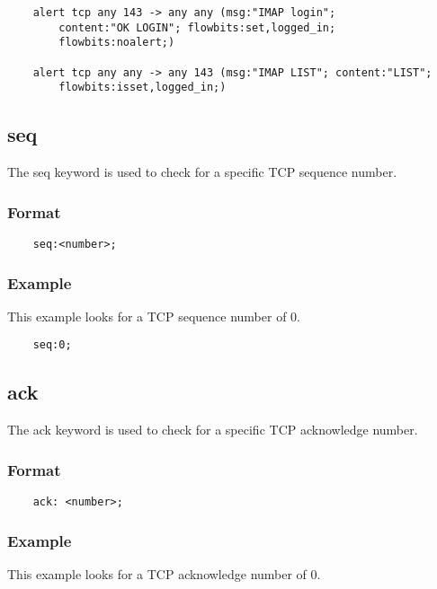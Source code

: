 \documentclass[english]{report}
\begin{document}
\begin{verbatim}
    alert tcp any 143 -> any any (msg:"IMAP login"; 
        content:"OK LOGIN"; flowbits:set,logged_in; 
        flowbits:noalert;)
      
    alert tcp any any -> any 143 (msg:"IMAP LIST"; content:"LIST"; 
        flowbits:isset,logged_in;)
\end{verbatim}

\subsection{seq}

The seq keyword is used to check for a specific TCP sequence number.

\subsubsection{Format}

\begin{verbatim}
    seq:<number>;
\end{verbatim}

\subsubsection{Example}

This example looks for a TCP sequence number of 0.

\begin{verbatim}
    seq:0;
\end{verbatim}

\subsection{ack}

The ack keyword is used to check for a specific TCP acknowledge number.

\subsubsection{Format}

\begin{verbatim}
    ack: <number>;
\end{verbatim}

\subsubsection{Example}

This example looks for a TCP acknowledge number of 0.
\end{document}
